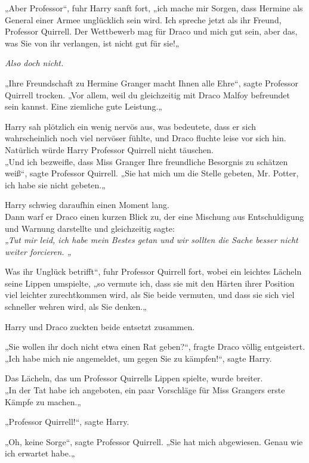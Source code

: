 {„Aber Professor“, fuhr Harry sanft fort, „ich mache mir Sorgen, dass Hermine als General einer Armee unglücklich sein wird. Ich spreche jetzt als ihr Freund, Professor Quirrell. Der Wettbewerb mag für Draco und mich gut sein, aber das, was Sie von ihr verlangen, ist nicht gut für sie!„

\emph{Also doch nicht.}

„Ihre Freundschaft zu Hermine Granger macht Ihnen alle Ehre“, sagte Professor Quirrell trocken. „Vor allem, weil du gleichzeitig mit Draco Malfoy befreundet sein kannst. Eine ziemliche gute Leistung.„

Harry sah plötzlich ein wenig nervös aus, was bedeutete, dass er sich wahrscheinlich noch viel nervöser fühlte, und Draco fluchte leise vor sich hin.\\ Natürlich würde Harry Professor Quirrell nicht täuschen.\\ „Und ich bezweifle, dass Miss Granger Ihre freundliche Besorgnis zu schätzen weiß“, sagte Professor Quirrell. „Sie hat mich um die Stelle gebeten, Mr. Potter, ich habe sie nicht gebeten.„

Harry schwieg daraufhin einen Moment lang.\\ Dann warf er Draco einen kurzen Blick zu, der eine Mischung aus Entschuldigung und Warnung darstellte und gleichzeitig sagte:\\ \emph{„Tut mir leid, ich habe mein Bestes getan und wir sollten die Sache besser nicht weiter forcieren. „}

Was ihr Unglück betrifft“, fuhr Professor Quirrell fort, wobei ein leichtes Lächeln seine Lippen umspielte, „so vermute ich, dass sie mit den Härten ihrer Position viel leichter zurechtkommen wird, als Sie beide vermuten, und dass sie sich viel schneller wehren wird, als Sie denken.„

Harry und Draco zuckten beide entsetzt zusammen.

„Sie wollen ihr doch nicht etwa einen Rat geben?“, fragte Draco völlig entgeistert.\\ „Ich habe mich nie angemeldet, um gegen Sie zu kämpfen!“, sagte Harry.

Das Lächeln, das um Professor Quirrells Lippen spielte, wurde breiter.\\ „In der Tat habe ich angeboten, ein paar Vorschläge für Miss Grangers erste Kämpfe zu machen.„

„Professor Quirrell!“, sagte Harry.

„Oh, keine Sorge“, sagte Professor Quirrell. „Sie hat mich abgewiesen. Genau wie ich erwartet habe.„

}

